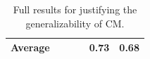 \begin{table}[ht!]
\begin{tabular}{lcclcc}


\midrule
Average &  & & &0.73 &0.68  \\
\bottomrule
\end{tabular}
\caption{Full results for justifying the generalizability of CM.}
\label{tab:fullfour}
\end{table}
  


